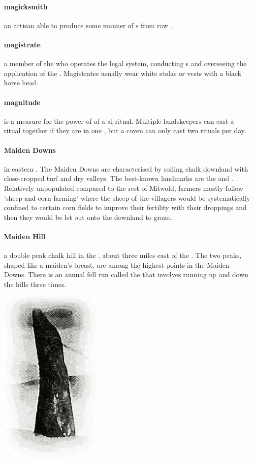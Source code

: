 \paragraph{magicksmith} an artisan able to produce some manner of s from raw .
\paragraph{magistrate} a member of the  who operates the legal system, conducting s and overseeing the application of the . Magistrates usually wear white stolas or vests with a black horse head.
\paragraph{magnitude} is a measure for the power of of a al ritual. Multiple landskeepers can cast a ritual together if they are in one , but a coven can only cast two rituals per day.
\paragraph{Maiden Downs}  in eastern . The Maiden Downs are characterised by rolling chalk downland with close-cropped turf and dry valleys. The best-known landmarks are the  and . Relatively unpopulated compared to the rest of Mitwold, farmers mostly follow 'sheep-and-corn farming' where the sheep of the villagers would be systematically confined to certain corn fields to improve their fertility with their droppings and then they would be let out onto the downland to graze.
\paragraph{Maiden Hill} a double peak chalk hill in the , about three miles east of the . The two peaks, shaped like a maiden’s breast, are among the highest points in the Maiden Downs. There is an annual fell run called the  that involves running up and down the hills three times.
\begin{center}\includegraphics[width=5.04cm]{encyclopedia/Maidenstone.jpg} \end{center}
